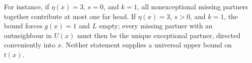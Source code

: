 For instance, if $\eta(x)=3$, $s=0$, and $k=1$, all nonexceptional
missing partners together contribute at most one far head. If
$\eta(x)=3$, $s>0$, and $k=1$, the bound forces $g(x)=1$ and $L$ empty;
every missing partner with an outneighbour in $U(x)$ must then be the
unique exceptional partner, directed conveniently into $x$.
Neither statement supplies a universal upper bound on $t(x)$.
